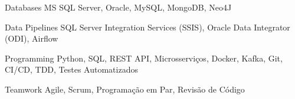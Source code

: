 


\begin{cvskills}


\cvskill
{Databases} %
{MS SQL Server, Oracle, MySQL, MongoDB, Neo4J} %

\cvskill
{Data Pipelines} %
{SQL Server Integration Services (SSIS), Oracle Data Integrator (ODI), Airflow} %

\cvskill
{Programming} %
{Python, SQL, REST API, Microsserviços, Docker, Kafka, Git, CI/CD, TDD, Testes Automatizados} %


\cvskill
{Teamwork} %
{Agile, Scrum, Programação em Par, Revisão de Código} %


\end{cvskills}